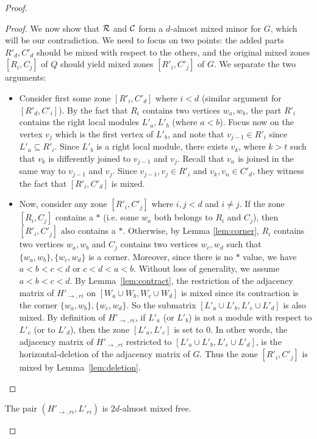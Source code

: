 \documentclass[11pt]{article}
\numberwithin{equation}{section}
\begin{document}
\begin{proof}
\begin{proof}
We now show that ${\cal R}$ and ${\cal C}$ form a $d$-almost mixed minor for $G$, which will be our contradiction. We need to focus on two points: the added parts $R'_d,C'_d$ should be mixed with respect to the others, and the original mixed zones $[R_i,C_j]$ of $Q$ should yield mixed zones $[R'_i,C'_j]$ of $G$. We separate the two arguments:
\begin{itemize}
    \item Consider first some zone $[R'_i,C'_d]$ where $i<d$ (similar argument for $[R'_d,C'_i]$). By the fact that $R_i$ contains two vertices $w_a,w_b$, the part $R'_i$ contains the right local modules $L'_a,L'_b$ (where $a<b$). Focus now on the vertex $v_j$ which is the first vertex of $L'_b$, and note that $v_{j-1}\in R'_i$ since $L'_a\subseteq R'_i$. Since $L'_b$ is a right local module, there exists $v_k$, where $k>t$ such that $v_k$ is differently joined to $v_{j-1}$ and $v_j$. Recall that $v_n$ is joined in the same way to $v_{j-1}$ and $v_j$. Since $v_{j-1},v_j\in R'_i$ and $v_k,v_n\in C'_d$, they witness the fact that $[R'_i,C'_d]$ is mixed. 
    \item Now, consider any zone $[R'_i,C'_j]$ where $i,j<d$ and $i\neq j$. If the zone $[R_i,C_j]$ contains a $*$ (i.e. some $w_a$ both belongs to $R_i$ and $C_j$), then $[R'_i,C'_j]$ also contains a $*$. Otherwise, by Lemma \ref{lem:corner}, $R_i$ contains two vertices $w_a,w_b$ and $C_j$ contains two vertices $w_c,w_d$ such that $\{w_a,w_b\},\{w_c,w_d\}$ is a corner. Moreover, since there is no $*$ value, we have $a<b<c<d$ or $c<d<a<b$. Without loss of generality, we assume $a<b<c<d$. By Lemma~\ref{lem:contract}, the restriction of the adjacency matrix of $H'_{\rightarrow,ri}$ on $[W_a\cup W_b,W_c\cup W_d]$ is mixed since its contraction is the corner $\{w_a,w_b\},\{w_c,w_d\}$. So the submatrix $[L'_a\cup L'_b,L'_c\cup L'_d]$ is also mixed.
    By definition of $H'_{\rightarrow,ri}$, if $L'_a$ (or $L'_b$) is not a module with respect to $L'_c$ (or to $L'_d$), then the zone $[L'_a,L'_c]$ is set to 0. In other words, the adjacency matrix of $H'_{\rightarrow,ri}$ restricted to $[L'_a\cup L'_b,L'_c\cup L'_d]$, is the horizontal-deletion of the adjacency matrix of $G$. Thus the zone $[R'_i,C'_j]$ is mixed by Lemma~\ref{lem:deletion}.
\end{itemize}
\end{proof}
\begin{claim}
    The pair $(H'_{\rightarrow,ri},L'_{ri})$ is $2d$-almost mixed free.
\end{claim}


\end{proof}
\end{document}

